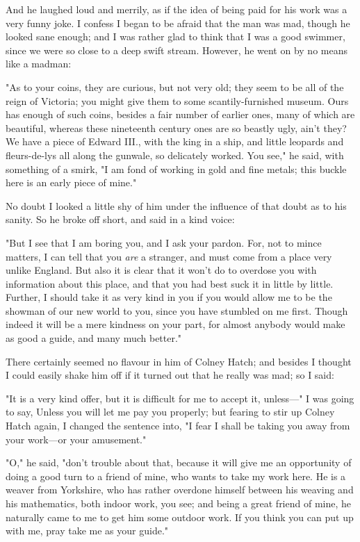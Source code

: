 And he laughed loud and merrily, as if the idea of being paid for his
work was a very funny joke. I confess I began to be afraid that the man
was mad, though he looked sane enough; and I was rather glad to think
that I was a good swimmer, since we were so close to a deep swift
stream. However, he went on by no means like a madman:

"As to your coins, they are curious, but not very old; they seem to be
all of the reign of Victoria; you might give them to some
scantily-furnished museum. Ours has enough of such coins, besides a fair
number of earlier ones, many of which are beautiful, whereas these
nineteenth century ones are so beastly ugly, ain't they? We have a piece
of Edward III., with the king in a ship, and little leopards and
fleurs-de-lys all along the gunwale, so delicately worked. You see," he
said, with something of a smirk, "I am fond of working in gold and fine
metals; this buckle here is an early piece of mine."

No doubt I looked a little shy of him under the influence of that doubt
as to his sanity. So he broke off short, and said in a kind voice:

"But I see that I am boring you, and I ask your pardon. For, not to
mince matters, I can tell that you \emph{are} a stranger, and must come
from a place very unlike England. But also it is clear that it won't do
to overdose you with information about this place, and that you had best
suck it in little by little. Further, I should take it as very kind in
you if you would allow me to be the showman of our new world to you,
since you have stumbled on me first. Though indeed it will be a mere
kindness on your part, for almost anybody would make as good a guide,
and many much better."

There certainly seemed no flavour in him of Colney Hatch; and besides I
thought I could easily shake him off if it turned out that he really was
mad; so I said:

"It is a very kind offer, but it is difficult for me to accept it,
unless---" I was going to say, Unless you will let me pay you properly;
but fearing to stir up Colney Hatch again, I changed the sentence into,
"I fear I shall be taking you away from your work---or your amusement."

"O," he said, "don't trouble about that, because it will give me an
opportunity of doing a good turn to a friend of mine, who wants to take
my work here. He is a weaver from Yorkshire, who has rather overdone
himself between his weaving and his mathematics, both indoor work, you
see; and being a great friend of mine, he naturally came to me to get
him some outdoor work. If you think you can put up with me, pray take me
as your guide."

